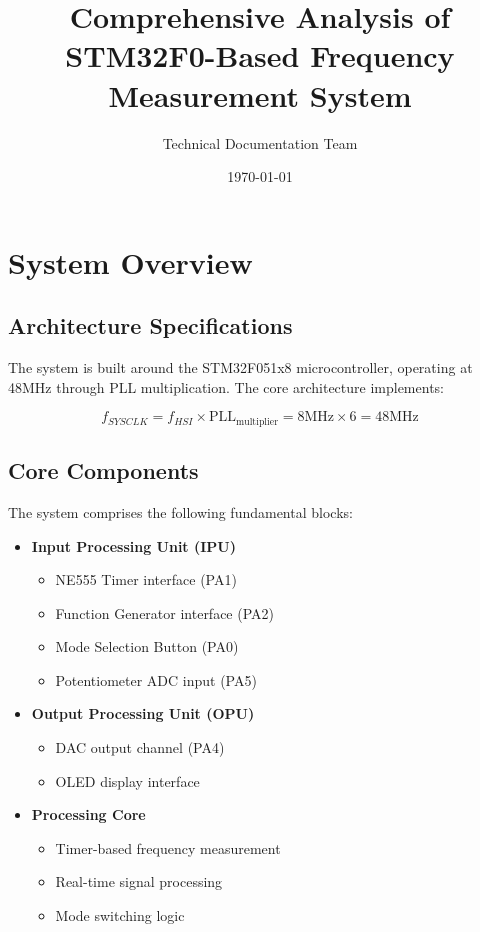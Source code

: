 \documentclass{article}
\title{Comprehensive Analysis of STM32F0-Based Frequency Measurement System}
\author{Technical Documentation Team}
\date{\today}
\begin{document}
\maketitle

\tableofcontents

\section{System Overview}
\subsection{Architecture Specifications}

The system is built around the STM32F051x8 microcontroller, operating at 48MHz through PLL multiplication. The core architecture implements:

\begin{equation}
f_{SYSCLK} = f_{HSI} \times \text{PLL}_{\text{multiplier}} = 8\text{MHz} \times 6 = 48\text{MHz}
\end{equation}

\subsection{Core Components}

The system comprises the following fundamental blocks:

\begin{itemize}
\item \textbf{Input Processing Unit (IPU)}
    \begin{itemize}
    \item NE555 Timer interface (PA1)
    \item Function Generator interface (PA2)
    \item Mode Selection Button (PA0)
    \item Potentiometer ADC input (PA5)
    \end{itemize}
\item \textbf{Output Processing Unit (OPU)}
    \begin{itemize}
    \item DAC output channel (PA4)
    \item OLED display interface
    \end{itemize}
\item \textbf{Processing Core}
    \begin{itemize}
    \item Timer-based frequency measurement
    \item Real-time signal processing
    \item Mode switching logic
    \end{itemize}
\end{itemize}
\end{document}
